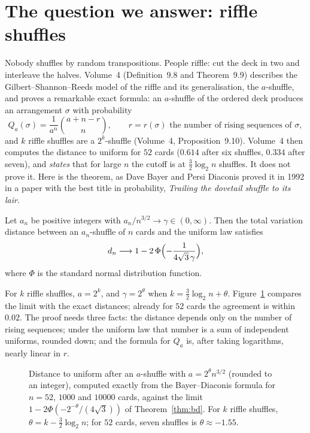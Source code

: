 \section{The question we answer: riffle shuffles}

Nobody shuffles by random transpositions. People riffle: cut the deck in two and interleave the halves. Volume~4 (Definition~9.8 and
Theorem~9.9) describes the Gilbert--Shannon--Reeds model of the riffle and its generalisation, the $a$-shuffle, and proves a
remarkable exact formula: an $a$-shuffle of the ordered deck produces an arrangement $\sigma$ with probability
\[
Q_a(\sigma)=\frac1{a^n}\binom{a+n-r}n,\qquad r=r(\sigma)\text{ the number of rising sequences of }\sigma,
\]
and $k$ riffle shuffles are a $2^k$-shuffle (Volume~4, Proposition~9.10). Volume~4 then computes the distance to uniform for $52$ cards ($0.614$ after six
shuffles, $0.334$ after seven), and \emph{states} that for large $n$ the cutoff is at $\frac32\log_2n$ shuffles. It does not prove it. Here is the
theorem, as Dave Bayer and Persi Diaconis proved it in 1992 in a paper with the best title in probability, \emph{Trailing the dovetail shuffle
to its lair}.

\begin{theorem}\label{thm:bd}
Let $a_n$ be positive integers with $a_n/n^{3/2}\to\gamma\in(0,\infty)$. Then the total variation distance between an $a_n$-shuffle of $n$ cards and the
uniform law satisfies
\[
d_n\longrightarrow1-2\,\Phi\Bigl(-\frac1{4\sqrt3\,\gamma}\Bigr),
\]
where $\Phi$ is the standard normal distribution function.
\end{theorem}

For $k$ riffle shuffles, $a=2^k$, and $\gamma=2^\theta$ when $k=\frac32\log_2n+\theta$. Figure~\ref{fig:riffle15} compares the limit with the exact distances; already for $52$
cards the agreement is within $0.02$. The proof needs three facts: the distance depends only on the number of rising sequences; under the
uniform law that number is a sum of independent uniforms, rounded down; and the formula for $Q_a$ is, after taking logarithms, nearly linear in $r$.

\begin{figure}[ht]
\centering
{}
\caption{Distance to uniform after an $a$-shuffle with $a=2^\theta n^{3/2}$ (rounded to an integer), computed exactly from the Bayer--Diaconis formula for $n=52$,
$1000$ and $10000$ cards, against the limit $1-2\Phi(-2^{-\theta}/(4\sqrt3))$ of Theorem~\ref{thm:bd}. For $k$ riffle shuffles, $\theta=k-\frac32\log_2n$; for $52$ cards,
seven shuffles is $\theta\approx-1.55$.}
\label{fig:riffle15}
\end{figure}

